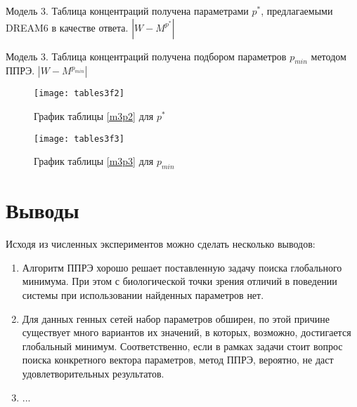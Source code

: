\begin{table}[h]
  \centering
  
  \caption{Модель 3. Таблица концентраций получена параметрами $p^*$, 
  предлагаемыми DREAM6 в качестве ответа. $|W - M^{p^*}|$}
  \label{m3p2}
\end{table}
\begin{table}[h]
  \centering
  
  \caption{Модель 3. Таблица концентраций получена подбором параметров 
  $p_{min}$ методом ППРЭ. $|W - M^{p_{min}}|$}
  \label{m3p3}
\end{table}
\begin{figure}[h]
  \begin{minipage}[h]{0.5\linewidth}
    \texttt{[image: tables3f2]}
    \caption{График таблицы \ref{m3p2} для $p^*$}
  \end{minipage}
  \hfill
  \begin{minipage}[h]{0.5\linewidth}
    \texttt{[image: tables3f3]}
    \caption{График таблицы \ref{m3p3} для $p_{min}$}
  \end{minipage}
\end{figure}

\clearpage
\section{Выводы} \label{s4}

Исходя из численных экспериментов можно сделать несколько выводов:

\begin{enumerate}
  \item Алгоритм ППРЭ хорошо решает поставленную задачу поиска глобального 
  минимума. При этом с биологической точки зрения отличий в поведении системы 
  при использовании найденных параметров нет.
  \item Для данных генных сетей набор параметров обширен, по этой причине 
  существует много вариантов их значений, в которых, возможно, достигается 
  глобальный минимум. Соответственно, если в рамках задачи стоит вопрос поиска 
  конкретного вектора параметров, метод ППРЭ, вероятно, не даст 
  удовлетворительных результатов.
  \item ...
\end{enumerate}


\clearpage
